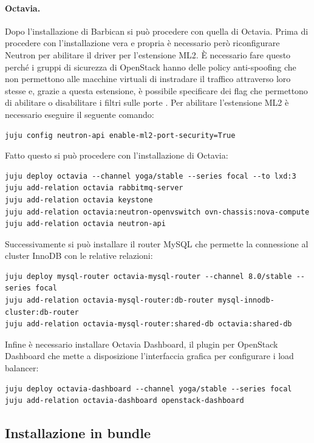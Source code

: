\paragraph{Octavia.} Dopo l'installazione di Barbican si può procedere con quella di Octavia. Prima di procedere con l'installazione vera e propria è necessario però riconfigurare Neutron per abilitare il driver per l'estensione ML2. È necessario fare questo perché i gruppi di sicurezza di OpenStack hanno delle policy anti-spoofing che non permettono alle macchine virtuali di instradare il traffico attraverso loro stesse e, grazie a questa estensione, è possibile specificare dei flag che permettono di abilitare o disabilitare i filtri sulle porte \cite{neutron_ml2_docs}. Per abilitare l'estensione ML2 è necessario eseguire il seguente comando:
\begin{lstlisting}[language=mybash]
juju config neutron-api enable-ml2-port-security=True
\end{lstlisting}
Fatto questo si può procedere con l'installazione di Octavia:
\begin{lstlisting}[language=mybash]
juju deploy octavia --channel yoga/stable --series focal --to lxd:3
juju add-relation octavia rabbitmq-server
juju add-relation octavia keystone
juju add-relation octavia:neutron-openvswitch ovn-chassis:nova-compute
juju add-relation octavia neutron-api
\end{lstlisting}
Successivamente si può installare il router MySQL che permette la connessione al cluster InnoDB con le relative relazioni:
\begin{lstlisting}[language=mybash]
juju deploy mysql-router octavia-mysql-router --channel 8.0/stable --series focal
juju add-relation octavia-mysql-router:db-router mysql-innodb-cluster:db-router
juju add-relation octavia-mysql-router:shared-db octavia:shared-db
\end{lstlisting}
Infine è necessario installare Octavia Dashboard, il plugin per OpenStack Dashboard che mette a disposizione l'interfaccia grafica per configurare i load balancer:
\begin{lstlisting}[language=mybash]
juju deploy octavia-dashboard --channel yoga/stable --series focal
juju add-relation octavia-dashboard openstack-dashboard
\end{lstlisting}

\subsection{Installazione in bundle}

